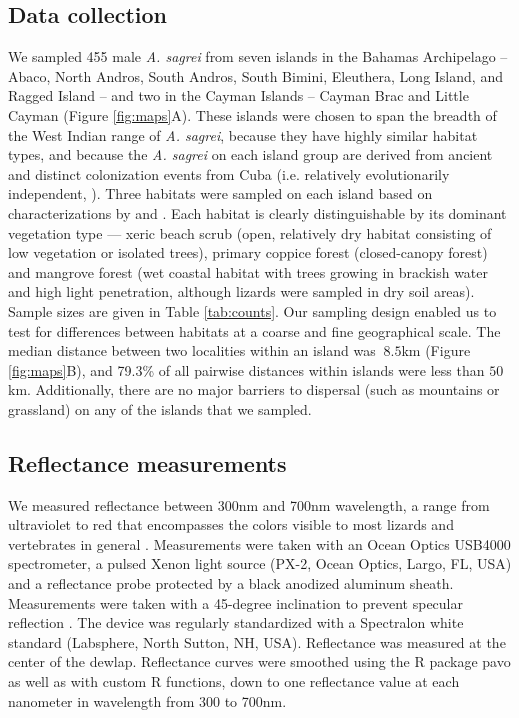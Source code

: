 \subsection*{Data collection}

We sampled 455 male \textit{A. sagrei} from seven islands in the Bahamas Archipelago -- Abaco, North Andros, South Andros, South Bimini, Eleuthera, Long Island, and Ragged Island -- and two in the Cayman Islands -- Cayman Brac and Little Cayman (Figure \ref{fig:maps}A). These islands were chosen to span the breadth of the West Indian range of \textit{A. sagrei}, because they have highly similar habitat types,  and because the \textit{A. sagrei} on each island group are derived from ancient and distinct colonization events from Cuba (i.e. relatively evolutionarily independent, \citealt{Reynolds2020}). Three habitats were sampled on each island based on characterizations by \citet{Howard1950} and \citet{Schoener1968}. Each habitat is clearly distinguishable by its dominant vegetation type --- xeric beach scrub (open, relatively dry habitat consisting of low vegetation or isolated trees), primary coppice forest (closed-canopy forest) and mangrove forest (wet coastal habitat with trees growing in brackish water and high light penetration, although lizards were sampled in dry soil areas). Sample sizes are given in Table \ref{tab:counts}. Our sampling design enabled us to test for differences between habitats at a coarse and fine geographical scale. The median distance between two localities within an island was $~8.5$km (Figure \ref{fig:maps}B), and 79.3\% of all pairwise distances within islands were less than $50$km. Additionally, there are no major barriers to dispersal (such as mountains or grassland) on any of the islands that we sampled.

\subsection*{Reflectance measurements}

We measured reflectance between 300nm and 700nm wavelength, a range from ultraviolet to red that encompasses the colors visible to most lizards and vertebrates in general \citep{Lazareva2012}. Measurements were taken with an Ocean Optics USB4000 spectrometer, a pulsed Xenon light source (PX-2, Ocean Optics, Largo, FL, USA) and a reflectance probe protected by a black anodized aluminum sheath. Measurements were taken with a 45-degree inclination to prevent specular reflection \citep{Endler1990}. The device was regularly standardized with a Spectralon white standard (Labsphere, North Sutton, NH, USA). Reflectance was measured at the center of the dewlap. Reflectance curves were smoothed using the R package pavo \citep{Maia2013} as well as with custom R functions, down to one reflectance value at each nanometer in wavelength from 300 to 700nm. 

